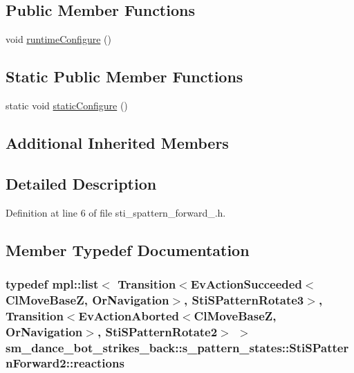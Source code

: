\subsection*{Public Member Functions}
\begin{DoxyCompactItemize}
\item 
void \hyperlink{structsm__dance__bot__strikes__back_1_1s__pattern__states_1_1StiSPatternForward2_a3f119b71a3b34675ed3504ac00e63e13}{runtime\+Configure} ()
\end{DoxyCompactItemize}
\subsection*{Static Public Member Functions}
\begin{DoxyCompactItemize}
\item 
static void \hyperlink{structsm__dance__bot__strikes__back_1_1s__pattern__states_1_1StiSPatternForward2_aefe0b731c67b2fbf1c73c66eac6f38b1}{static\+Configure} ()
\end{DoxyCompactItemize}
\subsection*{Additional Inherited Members}


\subsection{Detailed Description}


Definition at line 6 of file sti\+\_\+spattern\+\_\+forward\+\_.\+h.



\subsection{Member Typedef Documentation}
\subsubsection[{\texorpdfstring{reactions}{reactions}}]{\setlength{\rightskip}{0pt plus 5cm}typedef mpl\+::list$<$ Transition$<$Ev\+Action\+Succeeded$<${\bf Cl\+Move\+BaseZ}, {\bf Or\+Navigation}$>$, {\bf Sti\+S\+Pattern\+Rotate3}$>$, Transition$<$Ev\+Action\+Aborted$<${\bf Cl\+Move\+BaseZ}, {\bf Or\+Navigation}$>$, {\bf Sti\+S\+Pattern\+Rotate2}$>$ $>$ {\bf sm\+\_\+dance\+\_\+bot\+\_\+strikes\+\_\+back\+::s\+\_\+pattern\+\_\+states\+::\+Sti\+S\+Pattern\+Forward2\+::reactions}}\hypertarget{structsm__dance__bot__strikes__back_1_1s__pattern__states_1_1StiSPatternForward2_ab3483ca233c3db968c87b73e1f733168}{}\label{structsm__dance__bot__strikes__back_1_1s__pattern__states_1_1StiSPatternForward2_ab3483ca233c3db968c87b73e1f733168}


